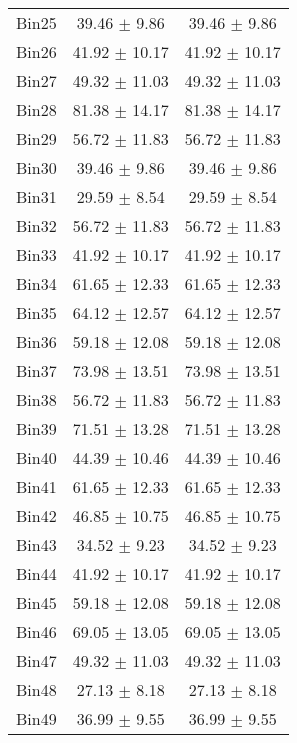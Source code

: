 \begin{tabular}{|c|c|c|}
     Bin25 & 39.46 $\pm$ 9.86 & 39.46 $\pm$ 9.86 \\ \cline{1-3} 
     Bin26 & 41.92 $\pm$ 10.17 & 41.92 $\pm$ 10.17 \\ \cline{1-3} 
     Bin27 & 49.32 $\pm$ 11.03 & 49.32 $\pm$ 11.03 \\ \cline{1-3} 
     Bin28 & 81.38 $\pm$ 14.17 & 81.38 $\pm$ 14.17 \\ \cline{1-3} 
     Bin29 & 56.72 $\pm$ 11.83 & 56.72 $\pm$ 11.83 \\ \cline{1-3} 
     Bin30 & 39.46 $\pm$ 9.86 & 39.46 $\pm$ 9.86 \\ \cline{1-3} 
     Bin31 & 29.59 $\pm$ 8.54 & 29.59 $\pm$ 8.54 \\ \cline{1-3} 
     Bin32 & 56.72 $\pm$ 11.83 & 56.72 $\pm$ 11.83 \\ \cline{1-3} 
     Bin33 & 41.92 $\pm$ 10.17 & 41.92 $\pm$ 10.17 \\ \cline{1-3} 
     Bin34 & 61.65 $\pm$ 12.33 & 61.65 $\pm$ 12.33 \\ \cline{1-3} 
     Bin35 & 64.12 $\pm$ 12.57 & 64.12 $\pm$ 12.57 \\ \cline{1-3} 
     Bin36 & 59.18 $\pm$ 12.08 & 59.18 $\pm$ 12.08 \\ \cline{1-3} 
     Bin37 & 73.98 $\pm$ 13.51 & 73.98 $\pm$ 13.51 \\ \cline{1-3} 
     Bin38 & 56.72 $\pm$ 11.83 & 56.72 $\pm$ 11.83 \\ \cline{1-3} 
     Bin39 & 71.51 $\pm$ 13.28 & 71.51 $\pm$ 13.28 \\ \cline{1-3} 
     Bin40 & 44.39 $\pm$ 10.46 & 44.39 $\pm$ 10.46 \\ \cline{1-3} 
     Bin41 & 61.65 $\pm$ 12.33 & 61.65 $\pm$ 12.33 \\ \cline{1-3} 
     Bin42 & 46.85 $\pm$ 10.75 & 46.85 $\pm$ 10.75 \\ \cline{1-3} 
     Bin43 & 34.52 $\pm$ 9.23 & 34.52 $\pm$ 9.23 \\ \cline{1-3} 
     Bin44 & 41.92 $\pm$ 10.17 & 41.92 $\pm$ 10.17 \\ \cline{1-3} 
     Bin45 & 59.18 $\pm$ 12.08 & 59.18 $\pm$ 12.08 \\ \cline{1-3} 
     Bin46 & 69.05 $\pm$ 13.05 & 69.05 $\pm$ 13.05 \\ \cline{1-3} 
     Bin47 & 49.32 $\pm$ 11.03 & 49.32 $\pm$ 11.03 \\ \cline{1-3} 
     Bin48 & 27.13 $\pm$ 8.18 & 27.13 $\pm$ 8.18 \\ \cline{1-3} 
     Bin49 & 36.99 $\pm$ 9.55 & 36.99 $\pm$ 9.55 \\ \cline{1-3} 

\end{tabular}
